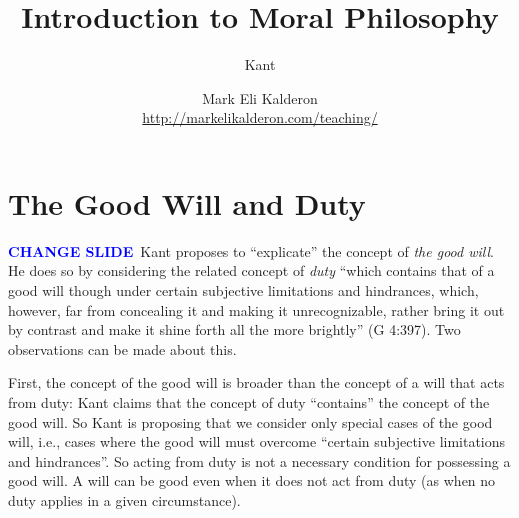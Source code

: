 %
%
%

\newcommand{\change}{\textcolor{blue}{\textbf{CHANGE SLIDE}}}
\def\myauthor{Mark Eli Kalderon} 
\def\mytitle{Introduction to Moral Philosophy}
\def\mysubtitle{Kant}
\def\myinstitution{University College London}
\def\myurl{http://markelikalderon.com/teaching/}



\usepackage{pgf}
\usepackage{tikz}
\usepackage{hyperref}


\title{\mytitle}
\subtitle{\mysubtitle}

\author{\myauthor\\
\url{\myurl}}
\institute{\myinstitution}




\frame{\maketitle}

\section{The Good Will and Duty}\label{sec:the_good_will_and_duty} %

\change\ Kant proposes to ``explicate'' the concept of \emph{the good will}. He does so by considering the related concept of \emph{duty} ``which contains that of a good will though under certain subjective limitations and hindrances, which, however, far from concealing it and making it unrecognizable, rather bring it out by contrast and make it shine forth all the more brightly'' (G 4:397). Two observations can be made about this.

First, the concept of the good will is broader than the concept of a will that acts from duty: Kant claims that the concept of duty ``contains'' the concept of the good will. So Kant is proposing that we consider only special cases of the good will, i.e., cases where the good will must overcome ``certain subjective limitations and hindrances''. So acting from duty is not a necessary condition for possessing a good will. A will can be good even when it does not act from duty (as when no duty applies in a given circumstance).

